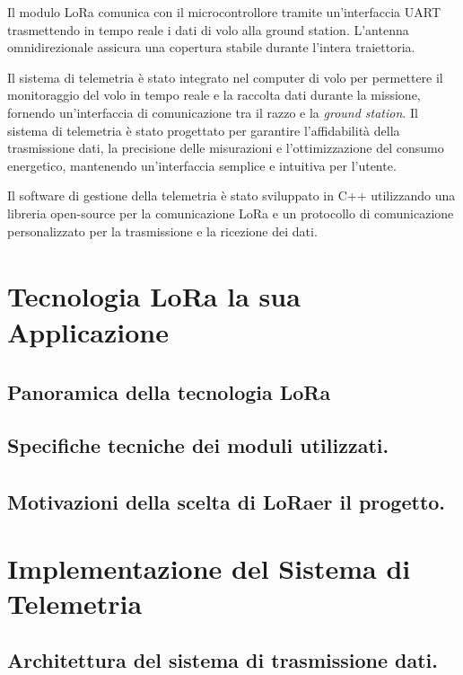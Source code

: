 \documentclass[12pt,a4paper,twoside]{book}
\begin{document}
Il modulo \ac{LoRa} comunica con il microcontrollore tramite un'interfaccia \ac{UART}
trasmettendo in tempo reale i dati di volo alla ground station. 
L'antenna omnidirezionale assicura una copertura stabile durante l'intera traiettoria.

Il sistema di telemetria è stato integrato nel computer di volo per permettere il
monitoraggio del volo in tempo reale e la raccolta dati durante la missione, 
fornendo un'interfaccia di comunicazione tra il razzo e la \emph{ground station}.
Il sistema di telemetria è stato progettato per garantire l'affidabilità della
trasmissione dati, la precisione delle misurazioni e l'ottimizzazione del consumo
energetico, mantenendo un'interfaccia semplice e intuitiva per l'utente.

Il software di gestione della telemetria è stato sviluppato in C++ utilizzando
una libreria open-source per la comunicazione \ac{LoRa} e un protocollo di
comunicazione personalizzato  
per la trasmissione e la ricezione dei dati.

\chapter{Tecnologia \texorpdfstring{LoRa\textsuperscript{\textcopyright}} e la sua Applicazione} \label{chap:lora}

\section{Panoramica della tecnologia \texorpdfstring{LoRa\textsuperscript{\textcopyright}}.}
\cite{Andrade2022}
\section{Specifiche tecniche dei moduli utilizzati.}
\section{Motivazioni della scelta di \texorpdfstring{LoRa\textsuperscript{\textcopyright}} per il progetto.}

\chapter{Implementazione del Sistema di Telemetria} \label{chap:telemetry}

\section{Architettura del sistema di trasmissione dati.}
\end{document}
